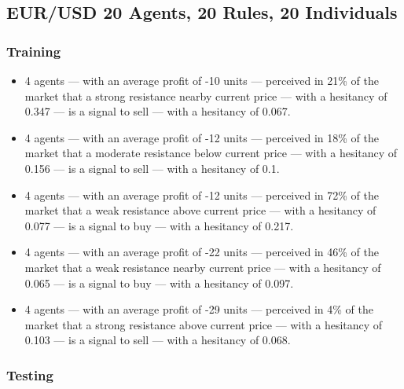 \subsection{EUR/USD 20 Agents, 20 Rules, 20 Individuals}
\label{}

\subsubsection{Training}
\label{}

{\small
  \begin{itemize}
  \item 4 agents — with an average profit of -10 units — perceived in 21\% of
    the market that a strong resistance nearby current price — with a hesitancy
    of 0.347 — is a signal to sell — with a hesitancy of 0.067.
  \item 4 agents — with an average profit of -12 units — perceived in 18\% of
    the market that a moderate resistance below current price — with a hesitancy
    of 0.156 — is a signal to sell — with a hesitancy of 0.1.
  \item 4 agents — with an average profit of -12 units — perceived in 72\% of
    the market that a weak resistance above current price — with a hesitancy of
    0.077 — is a signal to buy — with a hesitancy of 0.217.
  \item 4 agents — with an average profit of -22 units — perceived in 46\% of
    the market that a weak resistance nearby current price — with a hesitancy of
    0.065 — is a signal to buy — with a hesitancy of 0.097.
  \item 4 agents — with an average profit of -29 units — perceived in 4\% of the
    market that a strong resistance above current price — with a hesitancy of
    0.103 — is a signal to sell — with a hesitancy of 0.068.
  \end{itemize}
}

\subsubsection{Testing}
\label{}

